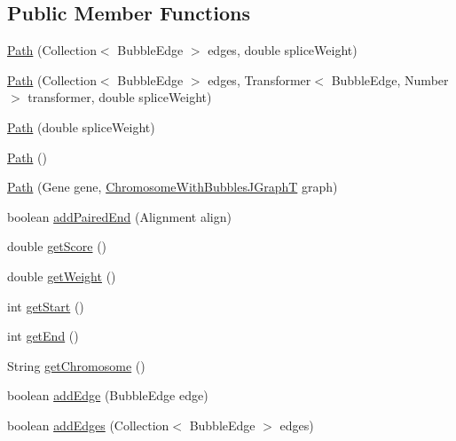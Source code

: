 \subsection*{Public Member Functions}
\begin{DoxyCompactItemize}
\item 
\hyperlink{classbroad_1_1pda_1_1seq_1_1graph_1_1_path_a1e877af09db984b0c825de14368b6e49}{Path} (Collection$<$ Bubble\+Edge $>$ edges, double splice\+Weight)
\item 
\hyperlink{classbroad_1_1pda_1_1seq_1_1graph_1_1_path_ad2c54a64f74327b8d3963c37dcc605a6}{Path} (Collection$<$ Bubble\+Edge $>$ edges, Transformer$<$ Bubble\+Edge, Number $>$ transformer, double splice\+Weight)
\item 
\hyperlink{classbroad_1_1pda_1_1seq_1_1graph_1_1_path_ab8e60000cc0f252386f79ce9ff6300f7}{Path} (double splice\+Weight)
\item 
\hyperlink{classbroad_1_1pda_1_1seq_1_1graph_1_1_path_a13f7cf2e93d07f686e3052582ff59a7e}{Path} ()
\item 
\hyperlink{classbroad_1_1pda_1_1seq_1_1graph_1_1_path_aba1355064dacefb2cb3ba3e08eb9aefc}{Path} (Gene gene, \hyperlink{classbroad_1_1pda_1_1seq_1_1graph_1_1_chromosome_with_bubbles_j_graph_t}{Chromosome\+With\+Bubbles\+J\+Graph\+T} graph)
\item 
boolean \hyperlink{classbroad_1_1pda_1_1seq_1_1graph_1_1_path_ae82c3e903f7927ccf02bc073500d012d}{add\+Paired\+End} (Alignment align)
\item 
double \hyperlink{classbroad_1_1pda_1_1seq_1_1graph_1_1_path_a04360d2166579e8b16be57484e375d9b}{get\+Score} ()
\item 
double \hyperlink{classbroad_1_1pda_1_1seq_1_1graph_1_1_path_a204f471b1073913ec667dab2860cdd72}{get\+Weight} ()
\item 
int \hyperlink{classbroad_1_1pda_1_1seq_1_1graph_1_1_path_ac65fac25077ec4dba79daa2fc9ad5682}{get\+Start} ()
\item 
int \hyperlink{classbroad_1_1pda_1_1seq_1_1graph_1_1_path_a653aaa69bcea0d35aeba7c92d9a68bb5}{get\+End} ()
\item 
String \hyperlink{classbroad_1_1pda_1_1seq_1_1graph_1_1_path_a00cd44d8c338e3e487e678d2858024f5}{get\+Chromosome} ()
\item 
boolean \hyperlink{classbroad_1_1pda_1_1seq_1_1graph_1_1_path_ace42c8682986c15cd37760fa88a51f5e}{add\+Edge} (Bubble\+Edge edge)
\item 
boolean \hyperlink{classbroad_1_1pda_1_1seq_1_1graph_1_1_path_a64893aa120e31b216858b66f7b270dbb}{add\+Edges} (Collection$<$ Bubble\+Edge $>$ edges)

\end{DoxyCompactItemize}
